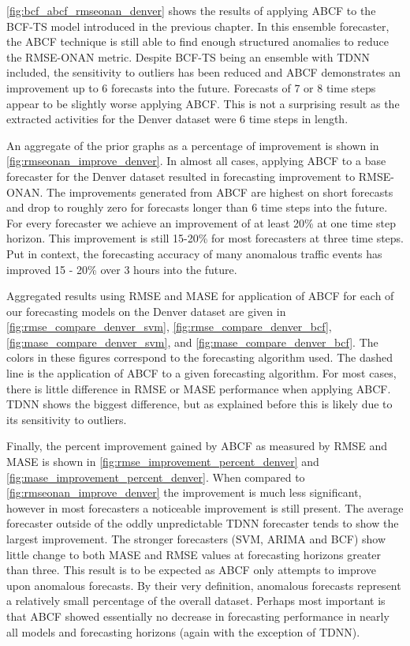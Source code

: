 \ref{fig:bcf_abcf_rmseonan_denver} shows the results of applying ABCF to the BCF-TS model introduced in the previous chapter.  In this ensemble forecaster, the ABCF technique is still able to find enough structured anomalies to reduce the RMSE-ONAN metric.  Despite BCF-TS being an ensemble with TDNN included, the sensitivity to outliers has been reduced and ABCF demonstrates an improvement up to 6 forecasts into the future.  Forecasts of 7 or 8 time steps appear to be slightly worse applying ABCF.  This is not a surprising result as the extracted activities for the Denver dataset were 6 time steps in length.

An aggregate of the prior graphs as a percentage of improvement is shown in \ref{fig:rmseonan_improve_denver}.  In almost all cases, applying ABCF to a base forecaster for the Denver dataset resulted in forecasting improvement to RMSE-ONAN.  The improvements generated from ABCF are highest on short forecasts and drop to roughly zero for forecasts longer than 6 time steps into the future.  For every forecaster we achieve an improvement of at least 20\% at one time step horizon.  This improvement is still 15-20\% for most forecasters at three time steps.  Put in context, the forecasting accuracy of many anomalous traffic events has improved 15 - 20\% over 3 hours into the future.

Aggregated results using RMSE and MASE for application of ABCF for each of our forecasting models on the Denver dataset are given in \ref{fig:rmse_compare_denver_svm}, \ref{fig:rmse_compare_denver_bcf}, \ref{fig:mase_compare_denver_svm}, and \ref{fig:mase_compare_denver_bcf}.  The colors in these figures correspond to the forecasting algorithm used.  The dashed line is the application of ABCF to a given forecasting algorithm.  For most cases, there is little difference in RMSE or MASE performance when applying ABCF.  TDNN shows the biggest difference, but as explained before this is likely due to its sensitivity to outliers.  

Finally, the percent improvement gained by ABCF as measured by RMSE and MASE is shown in \ref{fig:rmse_improvement_percent_denver} and \ref{fig:mase_improvement_percent_denver}.  When compared to \ref{fig:rmseonan_improve_denver} the improvement is much less significant, however in most forecasters a noticeable improvement is still present.  The average forecaster outside of the oddly unpredictable TDNN forecaster tends to show the largest improvement.  The stronger forecasters (SVM, ARIMA and BCF) show little change to both MASE and RMSE values at forecasting horizons greater than three.  This result is to be expected as ABCF only attempts to improve upon anomalous forecasts.  By their very definition, anomalous forecasts represent a relatively small percentage of the overall dataset.  Perhaps most important is that ABCF showed essentially no decrease in forecasting performance in nearly all models and forecasting horizons (again with the exception of TDNN).




